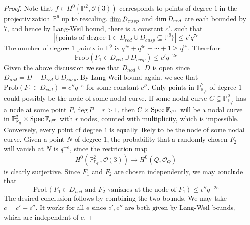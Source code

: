 \documentclass[12pt]{article}
\theoremstyle{plain}
\theoremstyle{definition}
\newcommand{\IF}{\mathbb{F}}
\newcommand{\IP}{\mathbb{P}}
\newcommand{\sO}{\mathcal{O}}
\renewcommand{\deg}{\mathrm{deg}\,}
\newcommand{\Spec}{\rm Spec\,}
\renewcommand\dim{{\rm dim\,}}
\newcommand{\<}{\langle}
\renewcommand{\>}{\rangle}
\newcommand{\Prob}{\mathrm{Prob}}
\begin{document}
\begin{proof}
Note that $f \in H^0(\IP^2, \sO(3))$ corresponds to points of degree $1$ in the projectivization $\IP^9$ up to rescaling. 
$\dim D_{cusp}$ and $\dim D_{red}$ are each bounded by $7$, and hence by Lang-Weil bound, there is a constant $c'$, such that 
$$ |\{ \text{points of degree }1 \in D_{red} \cup D_{cusp} \subseteq \IP^9\}| \le c'q^{7e} $$ 
The number of degree $1$ points in $\IP^9$ is $q^{9e} + q^{8e} + \cdots + 1 \ge q^{9e}$. Therefore $$\Prob(F_1 \in D_{red} \cup D_{cusp}) \le c' q^{-2e}$$
Given the above discussion we see that $D_{nod} \subseteq D$ is open since $D_{nod} = D - D_{red} \cup D_{cusp}$. By Lang-Weil bound again, we see that $\Prob(F_1 \in D_{nod}) = c'' q^{-e}$ for some constant $c''$. Only points in $\IP^2_{\IF_{q^e}}$ of degree $1$ could possibly be the node of some nodal curve. If some nodal curve $C \subseteq \IP^2_{\IF_{q^e}}$ has a node at some point $P$, $\deg P  = r > 1$, then $C \times \Spec \IF_{q^{er}} $ will be a nodal curve in $\IP^2_{\IF_q} \times \Spec \IF_{q^{er}}$ with $r$ nodes, counted with multiplicity, which is impossible. Conversely, every point of degree $1$ is equally likely to be the node of some nodal curve. Given a point $N$ of degree $1$, the probability that a randomly chosen $F_2$ will vanish at $N$ is $q^{-e}$, since the restriction map
$$ H^0(\IP^2_{\IF_{q^e}}, \sO(3)) \to H^0(Q, \sO_Q) $$
is clearly surjective. Since $F_1$ and $F_2$ are chosen independently, we may conclude that 
$$ \Prob(F_1 \in D_{nod} \text{ and } F_2 \text{ vanishes at the node of }F_1 ) \le c'' q^{-2e}$$
The desired conclusion follows by combining the two bounds. We may take $c = c' + c''$. It works for all $e$ since $c', c''$ are both given by Lang-Weil bounds, which are independent of $e$. 
\end{proof}
\end{document}
